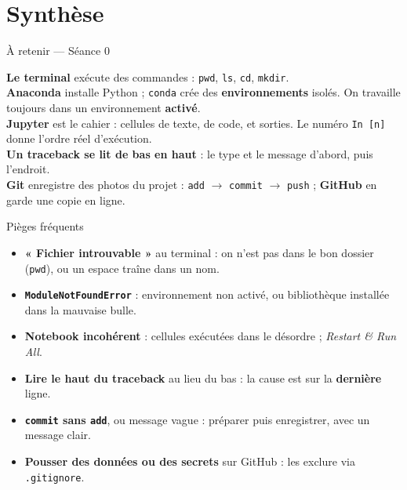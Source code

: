 \documentclass[aspectratio=169,11pt]{beamer}
\begin{document}
\section{Synthèse}

\begin{frame}{À retenir — Séance 0}
\begin{ucadret}[L'essentiel]
{\small
\textbf{Le terminal} exécute des commandes : \texttt{pwd}, \texttt{ls}, \texttt{cd}, \texttt{mkdir}.\\[2pt]
\textbf{Anaconda} installe Python ; \texttt{conda} crée des \textbf{environnements} isolés. On travaille toujours dans un environnement \textbf{activé}.\\[2pt]
\textbf{Jupyter} est le cahier : cellules de texte, de code, et sorties. Le numéro \texttt{In [n]} donne l'ordre réel d'exécution.\\[2pt]
\textbf{Un traceback se lit de bas en haut} : le type et le message d'abord, puis l'endroit.\\[2pt]
\textbf{Git} enregistre des photos du projet : \texttt{add} $\rightarrow$ \texttt{commit} $\rightarrow$ \texttt{push} ; \textbf{GitHub} en garde une copie en ligne.}
\end{ucadret}
\end{frame}

\begin{frame}{Pièges fréquents}
\begin{itemize}\small
  \item \textbf{« Fichier introuvable »} au terminal : on n'est pas dans le bon dossier (\texttt{pwd}), ou un espace traîne dans un nom.
  \item \textbf{\texttt{ModuleNotFoundError}} : environnement non activé, ou bibliothèque installée dans la mauvaise bulle.
  \item \textbf{Notebook incohérent} : cellules exécutées dans le désordre ; \emph{Restart \& Run All}.
  \item \textbf{Lire le haut du traceback} au lieu du bas : la cause est sur la \textbf{dernière} ligne.
  \item \textbf{\texttt{commit} sans \texttt{add}}, ou message vague : préparer puis enregistrer, avec un message clair.
  \item \textbf{Pousser des données ou des secrets} sur GitHub : les exclure via \texttt{.gitignore}.
\end{itemize}
\end{frame}
\end{document}
